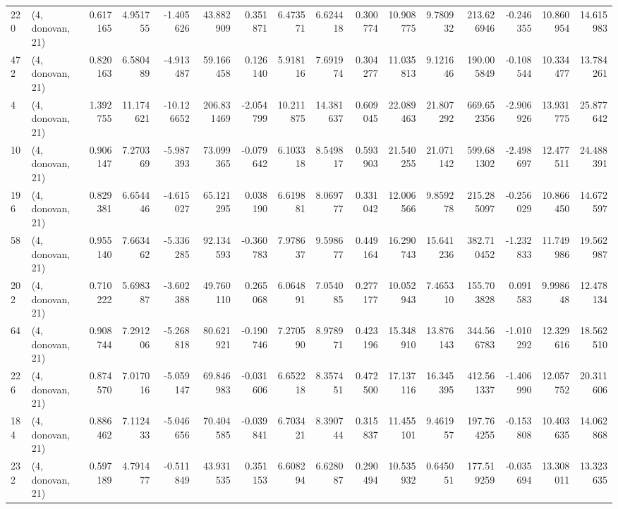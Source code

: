 \begin{tabular}{llrrrrrrrrrrrrrr}
220 &  (4, donovan, 21) &   0.617165 &   4.951755 &  -1.405626 &    43.882909 &   0.351871 &   6.473571 &   6.624418 &  0.300774 &  10.908775 &   9.780932 &   213.626946 &  -0.246355 &  10.860954 &  14.615983 \\
472 &  (4, donovan, 21) &   0.820163 &   6.580489 &  -4.913487 &    59.166458 &   0.126140 &   5.918116 &   7.691974 &  0.304277 &  11.035813 &   9.121646 &   190.005849 &  -0.108544 &  10.334477 &  13.784261 \\
4   &  (4, donovan, 21) &   1.392755 &  11.174621 & -10.126652 &   206.831469 &  -2.054799 &  10.211875 &  14.381637 &  0.609045 &  22.089463 &  21.807292 &   669.652356 &  -2.906926 &  13.931775 &  25.877642 \\
10  &  (4, donovan, 21) &   0.906147 &   7.270369 &  -5.987393 &    73.099365 &  -0.079642 &   6.103318 &   8.549817 &  0.593903 &  21.540255 &  21.071142 &   599.681302 &  -2.498697 &  12.477511 &  24.488391 \\
196 &  (4, donovan, 21) &   0.829381 &   6.654446 &  -4.615027 &    65.121295 &   0.038190 &   6.619881 &   8.069777 &  0.331042 &  12.006566 &   9.859278 &   215.285097 &  -0.256029 &  10.866450 &  14.672597 \\
58  &  (4, donovan, 21) &   0.955140 &   7.663462 &  -5.336285 &    92.134593 &  -0.360783 &   7.978637 &   9.598677 &  0.449164 &  16.290743 &  15.641236 &   382.710452 &  -1.232833 &  11.749986 &  19.562987 \\
202 &  (4, donovan, 21) &   0.710222 &   5.698387 &  -3.602388 &    49.760110 &   0.265068 &   6.064891 &   7.054085 &  0.277177 &  10.052943 &   7.465310 &   155.703828 &   0.091583 &   9.998648 &  12.478134 \\
64  &  (4, donovan, 21) &   0.908744 &   7.291206 &  -5.268818 &    80.621921 &  -0.190746 &   7.270590 &   8.978971 &  0.423196 &  15.348910 &  13.876143 &   344.566783 &  -1.010292 &  12.329616 &  18.562510 \\
226 &  (4, donovan, 21) &   0.874570 &   7.017016 &  -5.059147 &    69.846983 &  -0.031606 &   6.652218 &   8.357451 &  0.472500 &  17.137116 &  16.345395 &   412.561337 &  -1.406990 &  12.057752 &  20.311606 \\
184 &  (4, donovan, 21) &   0.886462 &   7.112433 &  -5.046656 &    70.404585 &  -0.039841 &   6.703421 &   8.390744 &  0.315837 &  11.455101 &   9.461957 &   197.764255 &  -0.153808 &  10.403635 &  14.062868 \\
232 &  (4, donovan, 21) &   0.597189 &   4.791477 &  -0.511849 &    43.931535 &   0.351153 &   6.608294 &   6.628087 &  0.290494 &  10.535932 &   0.645051 &   177.519259 &  -0.035694 &  13.308011 &  13.323635 \\

\end{tabular}
